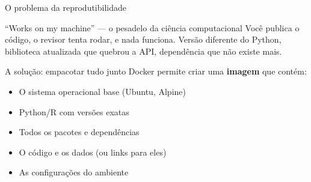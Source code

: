 \begin{frame}[shrink=20]{O problema da reprodutibilidade}
\begin{alertblock}{``Works on my machine'' — o pesadelo da ciência computacional}
Você publica o código, o revisor tenta rodar, e nada funciona. Versão diferente do Python, biblioteca atualizada que quebrou a API, dependência que não existe mais.
\end{alertblock}

\vspace{0.3cm}

\begin{block}{A solução: empacotar tudo junto}
Docker permite criar uma \textbf{imagem} que contém:
\begin{itemize}
    \item O sistema operacional base (Ubuntu, Alpine)
    \item Python/R com versões exatas
    \item Todos os pacotes e dependências
    \item O código e os dados (ou links para eles)
    \item As configurações do ambiente
\end{itemize}
\end{block}

\vspace{0.1cm}
\end{frame}

